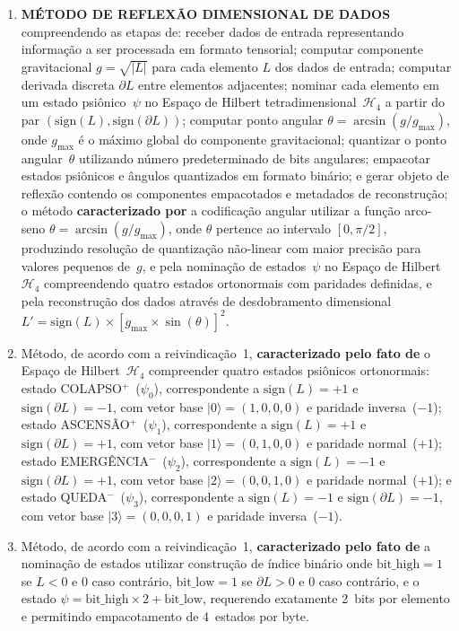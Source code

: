 \documentclass[12pt,a4paper]{article}
\newcommand{\Hfour}{\mathcal{H}_4}
\begin{document}
\begin{enumerate}

\item \textbf{MÉTODO DE REFLEXÃO DIMENSIONAL DE DADOS}
compreendendo as etapas de: receber dados de entrada
representando informação a ser processada em formato tensorial;
computar componente gravitacional $g = \sqrt{|L|}$ para cada
elemento $L$ dos dados de entrada; computar derivada discreta
$\partial L$ entre elementos adjacentes; nominar cada elemento
em um estado psiônico~$\psi$ no Espaço de Hilbert
tetradimensional~$\Hfour$ a partir do par
$(\text{sign}(L), \text{sign}(\partial L))$; computar ponto
angular $\theta = \arcsin(g/g_{\max})$, onde $g_{\max}$ é o
máximo global do componente gravitacional; quantizar o ponto
angular~$\theta$ utilizando número predeterminado de bits
angulares; empacotar estados psiônicos e ângulos quantizados em
formato binário; e gerar objeto de reflexão contendo os
componentes empacotados e metadados de reconstrução; o método
\textbf{caracterizado por} a codificação angular utilizar a
função arco-seno $\theta = \arcsin(g/g_{\max})$, onde $\theta$
pertence ao intervalo $[0, \pi/2]$, produzindo resolução de
quantização não-linear com maior precisão para valores pequenos
de~$g$, e pela nominação de estados~$\psi$ no Espaço de
Hilbert~$\Hfour$ compreendendo quatro estados ortonormais com
paridades definidas, e pela reconstrução dos dados através de
desdobramento dimensional
$L' = \text{sign}(L) \times [g_{\max} \times \sin(\theta)]^2$.

\item Método, de acordo com a reivindicação~1,
\textbf{caracterizado pelo fato de} o Espaço de
Hilbert~$\Hfour$ compreender quatro estados psiônicos
ortonormais: estado COLAPSO$^+$~($\psi_0$), correspondente a
$\text{sign}(L) = +1$ e $\text{sign}(\partial L) = -1$, com
vetor base $|0\rangle = (1,0,0,0)$ e paridade inversa~($-1$);
estado ASCENSÃO$^+$~($\psi_1$), correspondente a
$\text{sign}(L) = +1$ e $\text{sign}(\partial L) = +1$, com
vetor base $|1\rangle = (0,1,0,0)$ e paridade normal~($+1$);
estado EMERGÊNCIA$^-$~($\psi_2$), correspondente a
$\text{sign}(L) = -1$ e $\text{sign}(\partial L) = +1$, com
vetor base $|2\rangle = (0,0,1,0)$ e paridade normal~($+1$); e
estado QUEDA$^-$~($\psi_3$), correspondente a
$\text{sign}(L) = -1$ e $\text{sign}(\partial L) = -1$, com
vetor base $|3\rangle = (0,0,0,1)$ e paridade inversa~($-1$).

\item Método, de acordo com a reivindicação~1,
\textbf{caracterizado pelo fato de} a nominação de estados
utilizar construção de índice binário onde
$\text{bit\_high} = 1$ se $L < 0$ e $0$ caso contrário,
$\text{bit\_low} = 1$ se $\partial L > 0$ e $0$ caso contrário,
e o estado $\psi = \text{bit\_high} \times 2 + \text{bit\_low}$,
requerendo exatamente 2~bits por elemento e permitindo
empacotamento de 4~estados por byte.


\end{enumerate}
\end{document}
